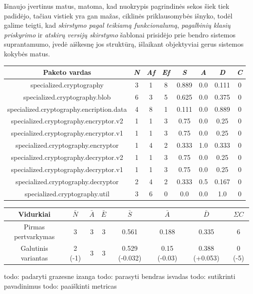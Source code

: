 Išnaujo įvertinus matus, matoma, kad nuokrypis pagrindinės sekos šiek tiek padidėjo, tačiau
vistiek yra gan mažas, ciklinės priklausomybės išnyko, todėl galime teigti, kad \textit{skirstymo pagal teikiamą funkcionalumą},
\textit{pagalbinių klasių priskyrimo} ir \textit{atskirų versijų skirstymo} šablonai prisidėjo prie bendro
sistemos suprantamumo, įvedė aiškesnę jos struktūrą, išlaikant objektyviai gerus sistemos kokybės matus.
\begin{center}
    \begin{tabular}{|c|c|c|c|c|c|c|c|}
        \hline
        Paketo vardas & \textit{N} & \textit{Af} & \textit{Ef} & \textit{S} & \textit{A} & \textit{D} & \textit{C} \\ [0.5ex]
        \hline\hline
        specialized.cryptography & 3 & 1 & 8 & 0.889 & 0.0 & 0.111 & 0 \\
        \hline
        specialized.cryptography.blob & 6 & 3 & 5 & 0.625 & 0.0 & 0.375 & 0 \\
        \hline
        specialized.cryptography.encription.data & 4 & 8 & 1 & 0.111 & 0.0 & 0.889 & 0 \\
        \hline
        specialized.cryptography.encryptor.v2 & 1 & 1 & 3 & 0.75 & 0.0 & 0.25 & 0 \\
        \hline
        specialized.cryptography.encryptor.v1 & 1 & 1 & 3 & 0.75 & 0.0 & 0.25 & 0 \\
        \hline
        specialized.cryptography.encryptor & 1 & 4 & 2 & 0.333 & 1.0 & 0.333 & 0 \\
        \hline
        specialized.cryptography.decryptor.v2 & 1 & 1 & 3 & 0.75 & 0.0 & 0.25 & 0 \\
        \hline
        specialized.cryptography.decryptor.v1 & 1 & 1 & 3 & 0.75 & 0.0 & 0.25 & 0 \\
        \hline
        specialized.cryptography.decryptor & 2 & 4 & 2 & 0.333 & 0.5 & 0.167 & 0 \\
        \hline
        specialized.cryptography.util & 3 & 6 & 0 & 0.0 & 0.0 & 1.0 & 0 \\
        \hline
    \end{tabular}
    \begin{tabular}{|c|c|c|c|c|c|c|c|}
        \hline
        Vidurkiai & $\bar{N}$ & $\bar{A}$ & $\bar{E}$ & $\bar{S}$ & $\bar{A}$ & $\bar{D}$ & $\Sigma C$ \\ [0.5ex]
        \hline\hline
        Pirmas pertvarkymas & 3 & 3 & 3 & 0.561 & 0.188 & 0.335 &  6 \\
        Galutinis variantas & \cellcolor{green!25} 2 (-1) & 3 & 3 & \cellcolor{green!25} 0.529 (-0.032) & \cellcolor{red!25} 0.15 (-0.03) & \cellcolor{red!25} 0.388 (+0.053) &  \cellcolor{green!25} 0 (-5) \\
        \hline
    \end{tabular}
\end{center}

todo: padaryti grazesne izanga
todo: parasyti bendras isvadas
todo: sutikrinti pavadinimus
todo: paaiškinti metricas
